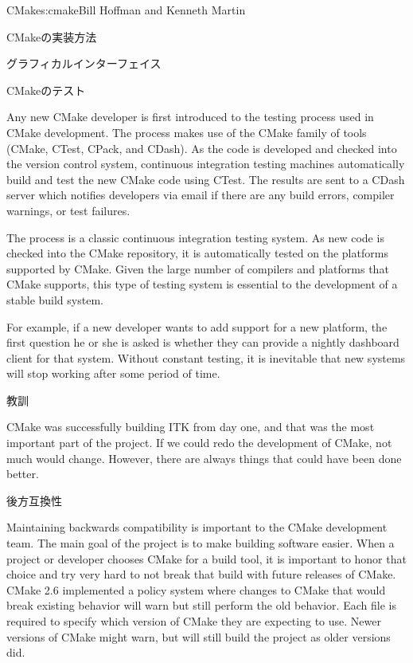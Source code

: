 \begin{aosachapter}{CMake}{s:cmake}{Bill Hoffman and Kenneth Martin}
\begin{aosasect1}{CMakeの実装方法}
\begin{aosasect2}{グラフィカルインターフェイス}
\end{aosasect2}

\begin{aosasect2}{CMakeのテスト}

Any new CMake developer is first introduced to the testing process
used in CMake development. The process makes use of the CMake family
of tools (CMake, CTest, CPack, and CDash).  As the code is developed
and checked into the version control system, continuous integration
testing machines automatically build and test the new CMake code using
CTest. The results are sent to a CDash server which notifies
developers via email if there are any build errors, compiler warnings,
or test failures.

The process is a classic continuous integration testing system. As new
code is checked into the CMake repository, it is automatically tested
on the platforms supported by CMake. Given the large number of
compilers and platforms that CMake supports, this type of testing
system is essential to the development of a stable build system.

For example, if a new developer wants to add support for a new
platform, the first question he or she is asked is whether they can
provide a nightly dashboard client for that system. Without constant
testing, it is inevitable that new systems will stop working after
some period of time.

\end{aosasect2}

\end{aosasect1}

\begin{aosasect1}{教訓}

CMake was successfully building ITK from day one, and that was the
most important part of the project. If we could redo the development
of CMake, not much would change. However, there are always things that
could have been done better.

\begin{aosasect2}{後方互換性}

Maintaining backwards compatibility is important to the CMake
development team. The main goal of the project is to make building
software easier. When a project or developer chooses CMake for a build
tool, it is important to honor that choice and try very hard to not
break that build with future releases of CMake. CMake 2.6 implemented
a policy system where changes to CMake that would break existing
behavior will warn but still perform the old behavior. Each
 file is required to specify which version of
CMake they are expecting to use.  Newer versions of CMake might warn,
but will still build the project as older versions did.


\end{aosasect2}
\end{aosasect1}
\end{aosachapter}
